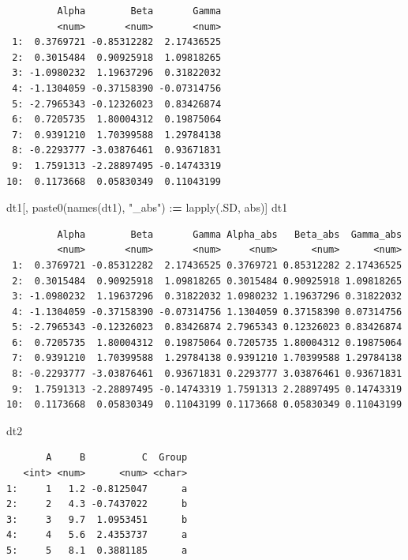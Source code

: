 \documentclass[
]{book}
\newenvironment{Shaded}{\begin{snugshade}}{\end{snugshade}}
\newcommand{\ErrorTok}[1]{\textcolor[rgb]{0.64,0.00,0.00}{\textbf{#1}}}
\newcommand{\FunctionTok}[1]{\textcolor[rgb]{0.00,0.00,0.00}{#1}}
\newcommand{\NormalTok}[1]{#1}
\newcommand{\SpecialCharTok}[1]{\textcolor[rgb]{0.00,0.00,0.00}{#1}}
\newcommand{\StringTok}[1]{\textcolor[rgb]{0.31,0.60,0.02}{#1}}
\begin{document}
\begin{verbatim}
         Alpha        Beta       Gamma
         <num>       <num>       <num>
 1:  0.3769721 -0.85312282  2.17436525
 2:  0.3015484  0.90925918  1.09818265
 3: -1.0980232  1.19637296  0.31822032
 4: -1.1304059 -0.37158390 -0.07314756
 5: -2.7965343 -0.12326023  0.83426874
 6:  0.7205735  1.80004312  0.19875064
 7:  0.9391210  1.70399588  1.29784138
 8: -0.2293777 -3.03876461  0.93671831
 9:  1.7591313 -2.28897495 -0.14743319
10:  0.1173668  0.05830349  0.11043199
\end{verbatim}

\begin{Shaded}
\begin{Highlighting}[]
\NormalTok{dt1[, }\FunctionTok{paste0}\NormalTok{(}\FunctionTok{names}\NormalTok{(dt1), }\StringTok{"\_abs"}\NormalTok{) }\SpecialCharTok{:}\ErrorTok{=} \FunctionTok{lapply}\NormalTok{(.SD, abs)]}
\NormalTok{dt1}
\end{Highlighting}
\end{Shaded}

\begin{verbatim}
         Alpha        Beta       Gamma Alpha_abs   Beta_abs  Gamma_abs
         <num>       <num>       <num>     <num>      <num>      <num>
 1:  0.3769721 -0.85312282  2.17436525 0.3769721 0.85312282 2.17436525
 2:  0.3015484  0.90925918  1.09818265 0.3015484 0.90925918 1.09818265
 3: -1.0980232  1.19637296  0.31822032 1.0980232 1.19637296 0.31822032
 4: -1.1304059 -0.37158390 -0.07314756 1.1304059 0.37158390 0.07314756
 5: -2.7965343 -0.12326023  0.83426874 2.7965343 0.12326023 0.83426874
 6:  0.7205735  1.80004312  0.19875064 0.7205735 1.80004312 0.19875064
 7:  0.9391210  1.70399588  1.29784138 0.9391210 1.70399588 1.29784138
 8: -0.2293777 -3.03876461  0.93671831 0.2293777 3.03876461 0.93671831
 9:  1.7591313 -2.28897495 -0.14743319 1.7591313 2.28897495 0.14743319
10:  0.1173668  0.05830349  0.11043199 0.1173668 0.05830349 0.11043199
\end{verbatim}

\begin{Shaded}
\begin{Highlighting}[]
\NormalTok{dt2}
\end{Highlighting}
\end{Shaded}

\begin{verbatim}
       A     B          C  Group
   <int> <num>      <num> <char>
1:     1   1.2 -0.8125047      a
2:     2   4.3 -0.7437022      b
3:     3   9.7  1.0953451      b
4:     4   5.6  2.4353737      a
5:     5   8.1  0.3881185      a
\end{verbatim}
\end{document}
